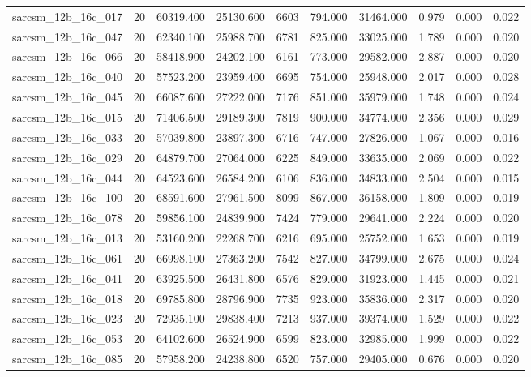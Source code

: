 \begin{tabular}{lrrrrrrrrr}
sarcsm\_12b\_16c\_017 & 20 & 60319.400 & 25130.600 & 6603 & 794.000 & 31464.000 & 0.979 & 0.000 & 0.022 \\
sarcsm\_12b\_16c\_047 & 20 & 62340.100 & 25988.700 & 6781 & 825.000 & 33025.000 & 1.789 & 0.000 & 0.020 \\
sarcsm\_12b\_16c\_066 & 20 & 58418.900 & 24202.100 & 6161 & 773.000 & 29582.000 & 2.887 & 0.000 & 0.020 \\
sarcsm\_12b\_16c\_040 & 20 & 57523.200 & 23959.400 & 6695 & 754.000 & 25948.000 & 2.017 & 0.000 & 0.028 \\
sarcsm\_12b\_16c\_045 & 20 & 66087.600 & 27222.000 & 7176 & 851.000 & 35979.000 & 1.748 & 0.000 & 0.024 \\
sarcsm\_12b\_16c\_015 & 20 & 71406.500 & 29189.300 & 7819 & 900.000 & 34774.000 & 2.356 & 0.000 & 0.029 \\
sarcsm\_12b\_16c\_033 & 20 & 57039.800 & 23897.300 & 6716 & 747.000 & 27826.000 & 1.067 & 0.000 & 0.016 \\
sarcsm\_12b\_16c\_029 & 20 & 64879.700 & 27064.000 & 6225 & 849.000 & 33635.000 & 2.069 & 0.000 & 0.022 \\
sarcsm\_12b\_16c\_044 & 20 & 64523.600 & 26584.200 & 6106 & 836.000 & 34833.000 & 2.504 & 0.000 & 0.015 \\
sarcsm\_12b\_16c\_100 & 20 & 68591.600 & 27961.500 & 8099 & 867.000 & 36158.000 & 1.809 & 0.000 & 0.019 \\
sarcsm\_12b\_16c\_078 & 20 & 59856.100 & 24839.900 & 7424 & 779.000 & 29641.000 & 2.224 & 0.000 & 0.020 \\
sarcsm\_12b\_16c\_013 & 20 & 53160.200 & 22268.700 & 6216 & 695.000 & 25752.000 & 1.653 & 0.000 & 0.019 \\
sarcsm\_12b\_16c\_061 & 20 & 66998.100 & 27363.200 & 7542 & 827.000 & 34799.000 & 2.675 & 0.000 & 0.024 \\
sarcsm\_12b\_16c\_041 & 20 & 63925.500 & 26431.800 & 6576 & 829.000 & 31923.000 & 1.445 & 0.000 & 0.021 \\
sarcsm\_12b\_16c\_018 & 20 & 69785.800 & 28796.900 & 7735 & 923.000 & 35836.000 & 2.317 & 0.000 & 0.020 \\
sarcsm\_12b\_16c\_023 & 20 & 72935.100 & 29838.400 & 7213 & 937.000 & 39374.000 & 1.529 & 0.000 & 0.022 \\
sarcsm\_12b\_16c\_053 & 20 & 64102.600 & 26524.900 & 6599 & 823.000 & 32985.000 & 1.999 & 0.000 & 0.022 \\
sarcsm\_12b\_16c\_085 & 20 & 57958.200 & 24238.800 & 6520 & 757.000 & 29405.000 & 0.676 & 0.000 & 0.020 \\

\end{tabular}

